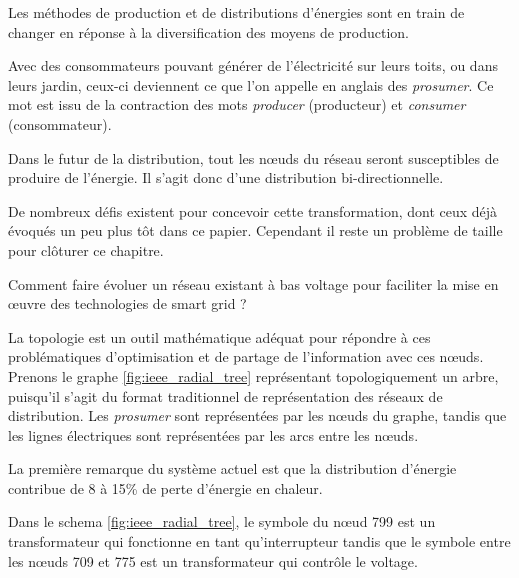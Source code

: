 Les méthodes de production et de distributions d'énergies sont en train de changer en réponse
à la diversification des moyens de production.

Avec des consommateurs pouvant générer de l'électricité sur leurs toits, ou dans leurs jardin,
ceux-ci deviennent ce que l'on appelle en anglais des \textit{prosumer}.
Ce mot est issu de la contraction des mots \textit{producer} (producteur) et
\textit{consumer} (consommateur).

Dans le futur de la distribution, tout les nœuds du réseau seront susceptibles de produire de l'énergie.
Il s'agit donc d'une distribution bi-directionnelle.

De nombreux défis existent pour concevoir cette transformation, dont ceux déjà évoqués un peu plus tôt dans ce papier.
Cependant il reste un problème de taille pour clôturer ce chapitre.

Comment faire évoluer un réseau existant à bas voltage pour faciliter la mise en œuvre des technologies
de smart grid ?

La topologie est un outil mathématique adéquat pour répondre à ces problématiques d'optimisation
et de partage de l'information avec ces nœuds.
Prenons le graphe \ref{fig:ieee_radial_tree} représentant topologiquement un arbre,
puisqu'il s'agit du format traditionnel de représentation des réseaux de distribution.
Les \textit{prosumer} sont représentées par les nœuds du graphe,
tandis que les lignes électriques sont représentées par les arcs entre les nœuds.

La première remarque du système actuel est que la distribution d'énergie contribue de 8 à 15\% de perte
d'énergie en chaleur.

Dans le schema \ref{fig:ieee_radial_tree}, le symbole du nœud 799 est un transformateur qui
fonctionne en tant qu'interrupteur tandis que le symbole entre les nœuds
709 et 775 est un transformateur qui contrôle le voltage.

